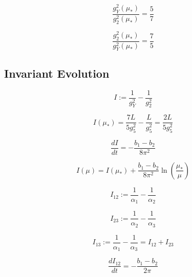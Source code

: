 \documentclass[11pt,a4paper]{article}
\theoremstyle{definition}
\begin{document}
\begin{equation}
\label{eq:ps_ext_7}
\frac{g_Y^2(\mu_*)}{g_2^2(\mu_*)} = \frac{5}{7}
\end{equation}

\begin{equation}
\label{eq:ps_ext_8}
\frac{g_2^2(\mu_*)}{g_Y^2(\mu_*)} = \frac{7}{5}
\end{equation}

\subsection{Invariant Evolution}
\label{subsec:inv_extended}

\begin{equation}
\label{eq:inv_ext_1}
I := \frac{1}{g_Y^2} - \frac{1}{g_2^2}
\end{equation}

\begin{equation}
\label{eq:inv_ext_2}
I(\mu_*) = \frac{7L}{5g_5^2} - \frac{L}{g_5^2} = \frac{2L}{5g_5^2}
\end{equation}

\begin{equation}
\label{eq:inv_ext_3}
\frac{dI}{dt} = -\frac{b_1 - b_2}{8\pi^2}
\end{equation}

\begin{equation}
\label{eq:inv_ext_4}
I(\mu) = I(\mu_*) + \frac{b_1 - b_2}{8\pi^2}\ln\left(\frac{\mu_*}{\mu}\right)
\end{equation}

\begin{equation}
\label{eq:inv_ext_5}
I_{12} := \frac{1}{\alpha_1} - \frac{1}{\alpha_2}
\end{equation}

\begin{equation}
\label{eq:inv_ext_6}
I_{23} := \frac{1}{\alpha_2} - \frac{1}{\alpha_3}
\end{equation}

\begin{equation}
\label{eq:inv_ext_7}
I_{13} := \frac{1}{\alpha_1} - \frac{1}{\alpha_3} = I_{12} + I_{23}
\end{equation}

\begin{equation}
\label{eq:inv_ext_8}
\frac{dI_{12}}{dt} = -\frac{b_1 - b_2}{2\pi}
\end{equation}
\end{document}
